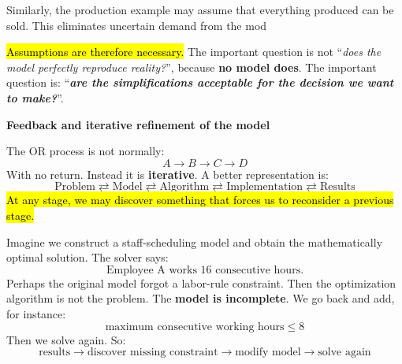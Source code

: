 \highspace
Similarly, the production example may assume that everything produced can be sold. This eliminates uncertain demand from the mod

\highspace
\hl{Assumptions are therefore necessary.} The important question is not ``\emph{does the model perfectly reproduce reality?}'', because \textbf{no model does}. The important question is: ``\emph{\textbf{are the simplifications acceptable for the decision we want to make?}}''.

\newpage

\begin{flushleft}
    \textcolor{Green3}{ \textbf{Feedback and iterative refinement of the model}}
\end{flushleft}
The OR process is not normally:
\begin{equation*}
    A\rightarrow B\rightarrow C\rightarrow D
\end{equation*}
With no return. Instead it is \textbf{iterative}. A better representation is:
\begin{equation*}
    \text{Problem}
    \rightleftarrows
    \text{Model}
    \rightleftarrows
    \text{Algorithm}
    \rightleftarrows
    \text{Implementation}
    \rightleftarrows
    \text{Results}
\end{equation*}
\hl{At any stage, we may discover something that forces us to reconsider a previous stage.}

\highspace
\begin{examplebox}[: Feedback]
    Imagine we construct a staff-scheduling model and obtain the mathematically optimal solution. The solver says:
    \begin{equation*}
        \text{Employee A works 16 consecutive hours.}
    \end{equation*}
    Perhaps the original model forgot a labor-rule constraint. Then the optimization algorithm is not the problem. The \textbf{model is incomplete}. We go back and add, for instance:
    \begin{equation*}
        \text{maximum consecutive working hours}\le 8
    \end{equation*}
    Then we solve again. So:
    \begin{equation*}
        \text{results}
        \rightarrow
        \text{discover missing constraint}
        \rightarrow
        \text{modify model}
        \rightarrow
        \text{solve again}
    \end{equation*}
\end{examplebox}

